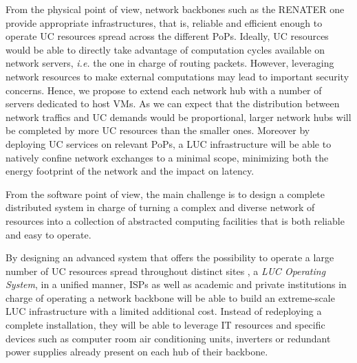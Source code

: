 From the physical point of view, network backbones such as the RENATER one provide
appropriate infrastructures, that is, reliable and efficient enough to operate UC
resources spread across the different PoPs. Ideally, UC resources would be able to
directly
take advantage of computation cycles available on network servers, \textit{i.e.} the one
in charge of routing packets. However, leveraging network resources to make external
computations may lead to important security concerns. Hence, we propose to extend each
network hub with a number of servers dedicated to host VMs. As we can expect that the
distribution between network traffics and UC demands would be proportional, larger network
hubs will be completed by more UC resources than the smaller ones. Moreover by deploying
UC services on relevant PoPs, a LUC infrastructure will be able to natively confine
network exchanges to a minimal scope, minimizing both the energy footprint of the network
and the impact on latency.


From the software point of view, the main challenge is to design a complete distributed
system in charge of turning a complex and diverse network of resources into a collection
of abstracted computing facilities that is both reliable and easy to operate.

\begin{svgraybox}
By designing an advanced system that offers the possibility to operate a large
number of UC resources spread throughout distinct sites \ie, a \emph{LUC
  Operating System}, in a unified manner,
ISPs as well as academic and private institutions in
charge of operating a network backbone will be able to build an extreme-scale
LUC infrastructure with a limited additional cost. Instead of redeploying a
complete installation, they will be able to leverage IT resources and
specific devices such as computer room air conditioning units, inverters or
redundant power supplies already present on each hub of their
backbone. 
\end{svgraybox}


\medskip

